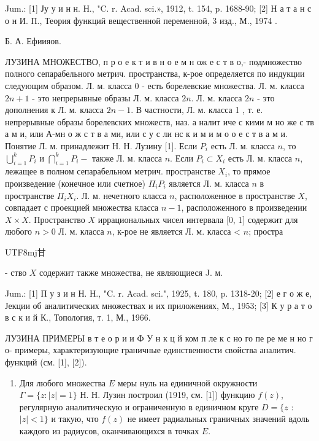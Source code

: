 \documentclass[10pt]{article}
\begin{document}
Jum.: [1] Ју у и н н. Н., "C. r. Acad. sci.», 1912, t. 154, p. 1688-90; [2] Н а т а н с о н И. П., Теория функций вещественной переменной, 3 изд., М., 1974 .



Б. А. Ефиияов.



ЛУЗИНА МНОЖЕСТВО, п р о е к т и в н о е м н ож е с т в о,- подмножество полного сепарабельного метрич. пространства, к-рое определяется по индукции следующим образом. Л. м. класса 0 - есть борелевские множества. Л. м. класса $2 n+1$ - это непрерывные образы Л. м. класса $2 n$. Л. м. класса $2 n$ - это дополнения к Л. м. класса $2 n-1$. В частности, Л. м. класса 1 , т. е. непрерывные образы борелевских множеств, наз. а налит иче с кими м но же с тв а м и, или А-мн о ж с т в а ми, или с у с ли нс к и м и м о о е с т в а м и. Понятие Л. м. принадлежит Н. Н. Лузину [1]. Если $P_{i}$ есть Л. м. класса $n$, то $\bigcup_{i=1}^{k} P_{i}$ и $\bigcap_{i=1}^{k} P_{i}-$ также Л. м. класса $n$. Если $P_{i} \subset X_{i}$ есть Л. м. класса $n$, лежащее в полном сепарабельном метрич. пространстве $X_{i}$, то прямое произведение (конечное или счетное) $\Pi_{i} P_{i}$ является Л. м. класса $n$ в пространстве $\Pi_{i} X_{i}$. Л. м. нечетного класса $n$, расположенное в пространстве $X$, совпадает с проекцией множества класса $n-1$, расположенного в произведении $X \times X$. Пространство $X$ иррациональных чисел интервала [0, 1] содержит для любого $n>0$ Л. м. класса $n$, к-рое не является Л. м. класса < $n$; простра\begin{CJK}{UTF8}{mj}甘\end{CJK}- ство $X$ содержит также множества, не являющиеся J. м.



Jum.: [1] П у з и н Н. Н., "C. r. Acad. sci.", 1925, t. 180, p. 1318-20; [2] е г о ж е, Јекции об аналитических множествах и их приложениях, М., 1953; [3] К у р а т о в с к и й К., Топология, т. 1, М., 1966.



ЛУЗИНА ПРИМЕРЫ в т е о р и и Ф У н к ц й ком п ле к с но го пе ре ме н но г о- примеры, характеризующие граничные единственности свойства аналитич. функций (см. [1], [2]).



\begin{enumerate}

  \item Для любого множества $E$ меры нуль на единичной окружности $\Gamma=\{z:|z|=1\}$ Н. Н. Лузин построил (1919, см. [1]) функцию $f(z)$, регулярную аналитическую и ограниченную в единичном круге $D=\{z$ : $|z|<1\}$ и такую, что $f(z)$ не имеет радиальных граничных значений вдоль каждого из радиусов, оканчивающихся в точках $E$.

\end{enumerate}
\end{document}
